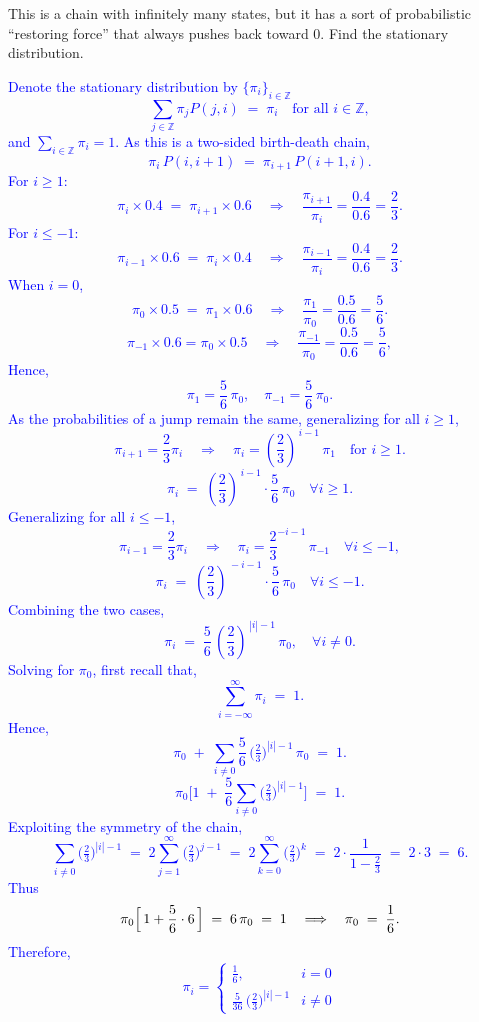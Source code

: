 \documentclass{article}
\begin{document}
This is a chain with infinitely many states, but it has a sort of probabilistic ``restoring force'' that always pushes back toward 0. Find the stationary distribution.

\textcolor{blue}{
Denote the stationary distribution by $\{\pi_i\}_{i\in\mathbb{Z}}$
\[
\sum_{j \in \mathbb{Z}} \pi_j P(j,i) \;=\; \pi_i
\quad \text{for all } i \in \mathbb{Z},
\]
and $\sum_{i \in \mathbb{Z}} \pi_i = 1$.
As this is a two-sided birth-death chain,
\[
\pi_i \, P(i, i+1) \;=\; \pi_{i+1} \, P(i+1, i).
\]
For $i \ge 1$:
\[
\pi_i \times 0.4 \;=\; \pi_{i+1} \times 0.6
\quad \Longrightarrow \quad 
\frac{\pi_{i+1}}{\pi_i} = \frac{0.4}{0.6} = \frac{2}{3}.
\]
For $i \le -1$:
\[
    \pi_{i-1} \times 0.6 \;=\; \pi_{i} \times 0.4
\quad \Longrightarrow \quad 
\frac{\pi_{i-1}}{\pi_i} = \frac{0.4}{0.6} = \frac{2}{3}.
\]
When $i=0$,
\[
\pi_0 \times 0.5 \;=\; \pi_1 \times 0.6
\quad \Longrightarrow \quad
\frac{\pi_1}{\pi_0} = \frac{0.5}{0.6} = \frac{5}{6}.
\]
\[
\pi_{-1} \times 0.6 = \pi_0 \times 0.5
\quad \Longrightarrow \quad 
\frac{\pi_{-1}}{\pi_{0}} = \frac{0.5}{0.6} = \frac{5}{6},
\]
Hence,
\[
\pi_1 = \frac{5}{6}\,\pi_0, 
\quad
\pi_{-1} = \frac{5}{6}\,\pi_0.
\]
As the probabilities of a jump remain the same, generalizing for all $i\geq1$,
\[
\pi_{i+1} = \frac{2}{3} \pi_{i}
\quad\Longrightarrow\quad 
\pi_i = \left(\frac{2}{3}\right)^{\,i-1} \,\pi_1
\quad \text{for } i \ge 1.
\]
\[
\pi_i 
\;=\; 
\left(\frac{2}{3}\right)^{\,i-1} \cdot \frac{5}{6}\,\pi_0
\quad \forall i \ge 1.
\]
Generalizing for all $i\leq-1$,
\[
    \pi_{i-1} = \frac{2}{3} \pi_{i}
\quad\Longrightarrow\quad
\pi_{i} = \frac{2}{3}^{-i-1}\,\pi_{-1}
\quad \forall i\leq -1,
\]
\[
    \pi_{i} 
\;=\; 
\left(\frac{2}{3}\right)^{\,-i-1} \cdot \frac{5}{6}\,\pi_0
\quad \forall i \leq -1.
\]
Combining the two cases,
\[
\pi_i 
\;=\;
\frac{5}{6}\,\left(\frac{2}{3}\right)^{\,|i|-1}\,\pi_0, \quad \forall i \neq 0.
\]
Solving for $\pi_0$, first recall that,
\[
\sum_{i=-\infty}^{\infty} \pi_i \;=\; 1.
\]
Hence,
\[
\pi_0 
\;+\;
\sum_{i\neq 0} \frac{5}{6} \,\biggl(\tfrac{2}{3}\biggr)^{|i|-1}\,\pi_0
\;=\; 1.
\]
\[
\pi_0 
\biggl[
1 
\;+\; 
\frac{5}{6}\sum_{i\neq 0}\bigl(\tfrac{2}{3}\bigr)^{|i|-1}
\biggr]
\;=\; 1.
\]
Exploiting the symmetry of the chain,
\[
\sum_{i\neq 0}\bigl(\tfrac{2}{3}\bigr)^{|i|-1} 
\;=\;
2 \sum_{j=1}^{\infty} \bigl(\tfrac{2}{3}\bigr)^{j-1}
\;=\;
2 \sum_{k=0}^{\infty} \bigl(\tfrac{2}{3}\bigr)^{k}
\;=\;
2 \cdot \frac{1}{1 - \tfrac{2}{3}}
\;=\;
2 \cdot 3
\;=\;
6.
\]
Thus
\[
\pi_0 \Bigl[\,1 + \frac56 \cdot 6\,\Bigr] 
\;=\;
6\,\pi_0
\;=\;
1 
\quad\Longrightarrow\quad
\pi_0 
\;=\; 
\frac{1}{6}.
\]
Therefore,
\[
\pi_i
=
\begin{cases}
\displaystyle \frac{1}{6},
& i=0\\[6pt]
\displaystyle \frac{5}{36}\,\bigl(\tfrac{2}{3}\bigr)^{|i|-1}
& i \neq 0
\end{cases}
\]
}
\end{document}

